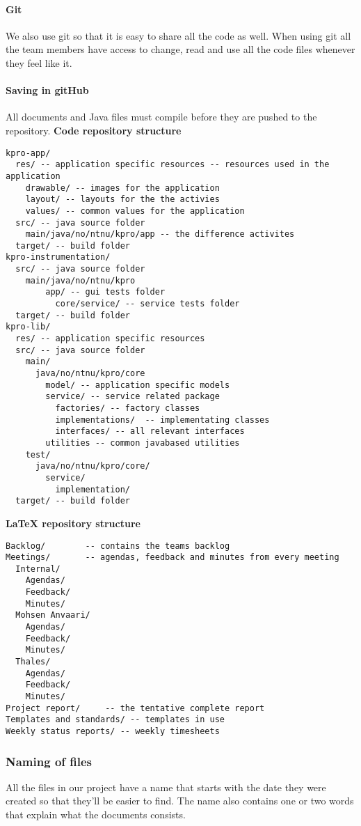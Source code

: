 \paragraph{Git}\hfill 
We also use git so that it is easy to share all the code as well. When using git all the team members have access to change, read and use all the code files whenever they feel like it.

\paragraph{Saving in gitHub}\hfill
All documents and Java files must compile before they are pushed to the repository.\newline
\textbf{Code repository structure}
\begin{verbatim}
kpro-app/
  res/ -- application specific resources -- resources used in the application
    drawable/ -- images for the application
    layout/ -- layouts for the the activies
    values/ -- common values for the application
  src/ -- java source folder
    main/java/no/ntnu/kpro/app -- the difference activites
  target/ -- build folder
kpro-instrumentation/
  src/ -- java source folder
    main/java/no/ntnu/kpro
	    app/ -- gui tests folder
		  core/service/ -- service tests folder
  target/ -- build folder
kpro-lib/
  res/ -- application specific resources
  src/ -- java source folder
    main/
      java/no/ntnu/kpro/core
        model/ -- application specific models
        service/ -- service related package
          factories/ -- factory classes
          implementations/  -- implementating classes
          interfaces/ -- all relevant interfaces
        utilities -- common javabased utilities
    test/
      java/no/ntnu/kpro/core/
        service/
          implementation/
  target/ -- build folder

\end{verbatim}
\textbf{LaTeX repository structure}
\begin{verbatim}
Backlog/		-- contains the teams backlog
Meetings/		-- agendas, feedback and minutes from every meeting
  Internal/
    Agendas/
    Feedback/
    Minutes/
  Mohsen Anvaari/
    Agendas/
    Feedback/
    Minutes/
  Thales/
    Agendas/
    Feedback/
    Minutes/
Project report/		-- the tentative complete report
Templates and standards/ -- templates in use
Weekly status reports/ -- weekly timesheets

\end{verbatim}


\subsubsection{Naming of files}
All the files in our project have a name that starts with the date they were created so that they’ll be easier to find. The name also contains one or two words that explain what the documents consists.

